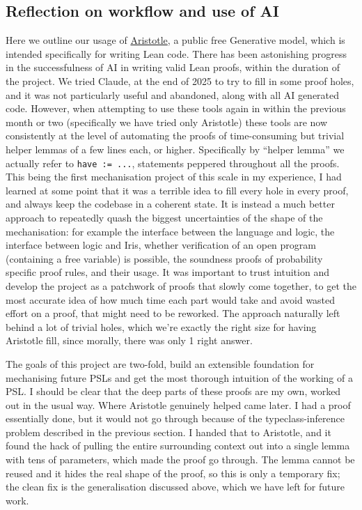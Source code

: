\subsection{Reflection on workflow and use of AI}
Here we outline our usage of \href{https://aristotle.harmonic.fun/dashboard}{Aristotle}, a public free Generative model, which is intended specifically for
writing Lean code. There has been astonishing progress in the successfulness of AI in writing valid Lean proofs, within the duration of the project.
We tried Claude, at the end of 2025 to try to fill in some proof holes, and it was not particularly useful and abandoned, along with all AI generated code.
However, when attempting to use these tools again in within the previous month or two (specifically we have tried only Aristotle) these tools are now consistently
at the level of automating the proofs of time-consuming but trivial helper lemmas of a few lines each, or higher. Specifically by ``helper lemma'' we actually refer
to \texttt{have := ...}, statements peppered throughout all the proofs. This being the first mechanisation project of this scale in my experience, I
had learned at some point that it was a terrible idea to fill every hole in every proof, and always keep the codebase in a coherent state. It is instead a
much better approach to repeatedly quash the biggest uncertainties of the shape of the mechanisation: for example the interface between the language and logic,
the interface between logic and Iris, whether verification of an open program (containing a free variable) is possible, the soundness proofs
of probability specific proof rules, and their usage. It was important to trust intuition and develop the project as a patchwork of proofs that slowly come together,
to get the most accurate idea of how much time each part would take and avoid wasted effort on a proof, that might need to be reworked. The approach naturally
left behind a lot of trivial holes, which we're exactly the right size for having Aristotle fill, since morally, there was only 1 right answer.


The goals of this project are two-fold, build an extensible foundation for mechanising future
PSLs and get the most thorough intuition of the working of a PSL.
I should be clear that the deep parts of these proofs are my own, worked out in the usual way. Where Aristotle genuinely helped came later. I had a proof essentially
done, but it would not go through because of the typeclass-inference problem described in the previous section. I handed that to Aristotle, and it found the hack of
pulling the entire surrounding context out into a single lemma with tens of parameters, which made the proof go through. The lemma cannot be reused and it hides the
real shape of the proof, so this is only a temporary fix; the clean fix is the generalisation discussed above, which we have left for future work.

